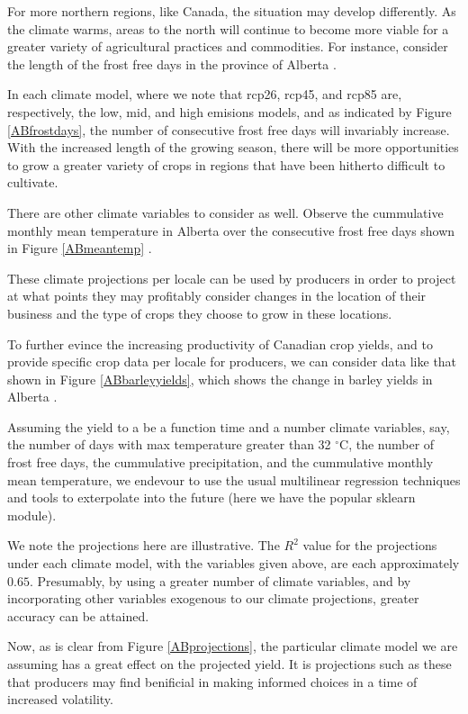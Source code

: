 \documentclass[11pt]{article}
\numberwithin{equation}{section}
\begin{document}
For more northern regions, like Canada, the situation may develop differently. As the climate warms, areas to the north will continue to become more viable for a greater variety of agricultural practices and commodities. For instance, consider the length of the frost free days in the province of Alberta \cite{climate-data}.

In each climate model, where we note that rcp26, rcp45, and rcp85 are, respectively, the low, mid, and high emisions models, and as indicated by Figure \ref{ABfrostdays}, the number of consecutive frost free days will invariably increase. With the increased length of the growing season, there will be more opportunities to grow a greater variety of crops in regions that have been hitherto difficult to cultivate.

There are other climate variables to consider as well. Observe the cummulative monthly mean temperature in Alberta over the consecutive frost free days shown in Figure \ref{ABmeantemp} \cite{climate-data}.

These climate projections per locale can be used by producers in order to project at what points they may profitably consider changes in the location of their business and the type of crops they choose to grow in these locations.

To further evince the increasing productivity of Canadian crop yields, and to provide specific crop data per locale for producers, we can consider data like that shown in Figure \ref{ABbarleyyields}, which shows the change in barley yields in Alberta \cite{stat-can}. 

Assuming the yield to a be a function time and a number climate variables, say, the number of days with max temperature greater than 32 $^\circ$C, the number of frost free days, the cummulative precipitation, and the cummulative monthly mean temperature, we endevour to use the usual multilinear regression techniques and tools to exterpolate into the future (here we have the popular sklearn module).

We note the projections here are illustrative. The $R^2$ value for the projections under each climate model, with the variables given above, are each approximately $0.65$. Presumably, by using a greater number of climate variables, and by incorporating other variables exogenous to our climate projections, greater accuracy can be attained.  

Now, as is clear from Figure \ref{ABprojections}, the particular climate model we are assuming has a great effect on the projected yield. It is projections such as these that producers may find benificial in making informed choices in a time of increased volatility.
\end{document}
